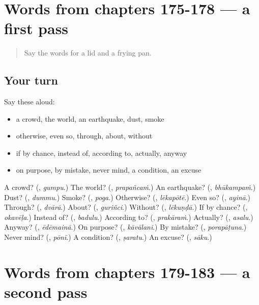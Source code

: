 \section[(dialogue)]{Words from chapters 175-178 — a first pass}

\label{lesson:TE-R183-first-pass-words-from-chapters-175-178}



\begin{quote}
Say the words for a lid and a frying pan.
\end{quote}

\subsection*{Your turn}
Say these aloud:

\begin{itemize}
\raggedright
  \item a crowd, the world, an earthquake, dust, smoke
  \item otherwise, even so, through, about, without
  \item if by chance, instead of, according to, actually, anyway
  \item on purpose, by mistake, never mind, a condition, an excuse
\end{itemize}

\begin{tcolorbox}[breakable,colback=teal!4,colframe=teal!35!black,title={Before you move on}]
A crowd? (\textbf{}, \emph{gumpu}.) The world? (\textbf{}, \emph{prapañcaṁ}.) An earthquake? (\textbf{}, \emph{bhūkampaṁ}.) Dust? (\textbf{}, \emph{dummu}.) Smoke? (\textbf{}, \emph{poga}.) Otherwise? (\textbf{}, \emph{lēkapōtē}.) Even so? (\textbf{}, \emph{ayinā}.) Through? (\textbf{}, \emph{dvārā}.) About? (\textbf{}, \emph{guriñci}.) Without? (\textbf{}, \emph{lēkuṇḍā}.) If by chance? (\textbf{}, \emph{okavēḷa}.) Instead of? (\textbf{}, \emph{badulu}.) According to? (\textbf{}, \emph{prakāraṁ}.) Actually? (\textbf{}, \emph{asalu}.) Anyway? (\textbf{}, \emph{ēdēmainā}.) On purpose? (\textbf{}, \emph{kāvālani}.) By mistake? (\textbf{}, \emph{porapāṭuna}.) Never mind? (\textbf{}, \emph{pōnī}.) A condition? (\textbf{}, \emph{ṣaratu}.) An excuse? (\textbf{}, \emph{sāku}.)
\end{tcolorbox}
\section[(dialogue)]{Words from chapters 179-183 — a second pass}

